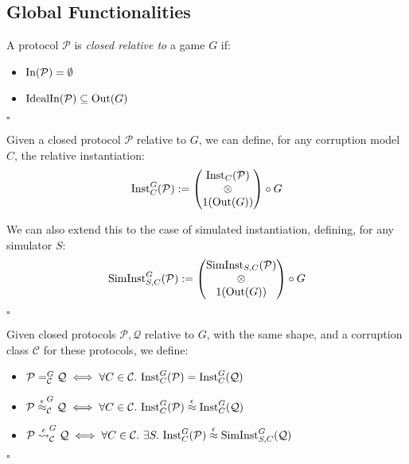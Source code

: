\subsection{Global Functionalities}

\begin{definition}
  A protocol $\mathcal{P}$ is \emph{closed relative to} a game $G$
  if:
  \begin{itemize}
    \item $\text{In}(\mathcal{P}) = \emptyset$
    \item $\text{IdealIn}(\mathcal{P}) \subseteq \text{Out}(G)$
  \end{itemize} 

  $\square$
\end{definition}
\begin{definition}
  Given a closed protocol $\mathcal{P}$ relative to $G$, we can define,
  for any corruption model $C$,
  the relative instantiation:
  $$
  \text{Inst}_{C}^G(\mathcal{P}) :=
  \begin{pmatrix}
    \text{Inst}_C(\mathcal{P})\cr
    \otimes\cr
    1(\text{Out}(G))
  \end{pmatrix}
  \circ G
  $$

  We can also extend this to the case of simulated instantiation,
  defining, for any simulator $S$:
  $$
  \text{SimInst}_{S, C}^G(\mathcal{P}) :=
  \begin{pmatrix}
    \text{SimInst}_{S, C}(\mathcal{P})\cr
    \otimes\cr
    1(\text{Out}(G))
  \end{pmatrix}
  \circ G
  $$

  $\square$
\end{definition}

\begin{definition}
  Given closed protocols $\mathcal{P}, \mathcal{Q}$ relative to $G$,
  with the same shape, and a corruption class $\mathcal{C}$
  for these protocols, we define:
  \begin{itemize}
    \item $\mathcal{P} =^G_{\mathcal{C}} \mathcal{Q} \iff \forall C \in \mathcal{C}.\ \text{Inst}^G_C(\mathcal{P}) = \text{Inst}^G_C(\mathcal{Q})$
    \item $\mathcal{P} \overset{\epsilon}{\approx}^G_{\mathcal{C}} \mathcal{Q}\iff \forall C \in \mathcal{C}.\ \text{Inst}^G_C(\mathcal{P}) \overset{\epsilon}{\approx} \text{Inst}^G_C(\mathcal{Q})$
    \item $\mathcal{P} \overset{\epsilon}{\leadsto}^G_{\mathcal{C}} \mathcal{Q}\iff \forall C \in \mathcal{C}.\ \exists S.\ \text{Inst}^G_C(\mathcal{P}) \overset{\epsilon}{\approx} \text{SimInst}^G_{S,C}(\mathcal{Q})$
  \end{itemize}

  $\square$
\end{definition}

